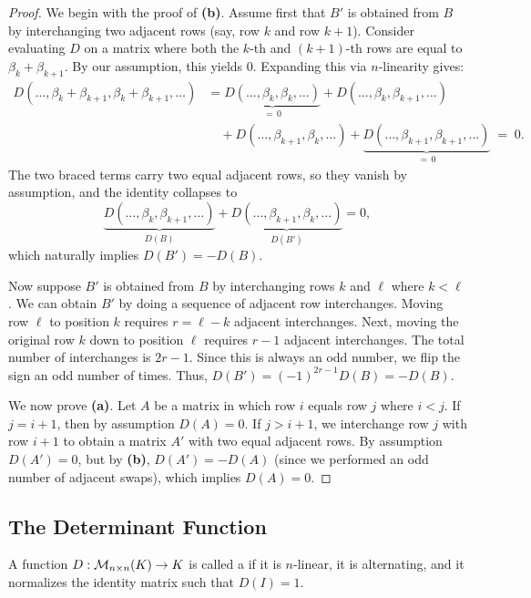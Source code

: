 \begin{proof}
  We begin with the proof of \textbf{(b)}. Assume first that $B'$ is obtained from $B$ by interchanging two adjacent rows (say, row $k$ and row $k+1$).
  Consider evaluating $D$ on a matrix where both the $k$-th and $(k+1)$-th rows are equal to $\beta_k + \beta_{k+1}$. By our assumption, this yields $0$.
  Expanding this via $n$-linearity gives:
  \begin{align*}
    D(\dots, \beta_k + \beta_{k+1}, \beta_k + \beta_{k+1}, \dots)
      &= \underbrace{D(\dots, \beta_k, \beta_k, \dots)}_{=\, 0}
       + D(\dots, \beta_k, \beta_{k+1}, \dots) \\
      &\quad + D(\dots, \beta_{k+1}, \beta_k, \dots)
       + \underbrace{D(\dots, \beta_{k+1}, \beta_{k+1}, \dots)}_{=\, 0} \;=\; 0.
  \end{align*}
  The two braced terms carry two equal adjacent rows, so they vanish by assumption, and the identity collapses to
  \[
  \underbrace{D(\dots, \beta_k, \beta_{k+1}, \dots)}_{D(B)}
  + \underbrace{D(\dots, \beta_{k+1}, \beta_k, \dots)}_{D(B')} = 0,
  \]
  which naturally implies $D(B') = -D(B)$.

  Now suppose $B'$ is obtained from $B$ by interchanging rows $k$ and $\ell$ where $k < \ell$. We can obtain $B'$ by doing a sequence of adjacent row interchanges. Moving row $\ell$ to position $k$ requires $r = \ell-k$ adjacent interchanges. Next, moving the original row $k$ down to position $\ell$ requires $r-1$ adjacent interchanges. The total number of interchanges is $2r - 1$. Since this is always an odd number, we flip the sign an odd number of times. Thus, $D(B') = (-1)^{2r-1} D(B) = -D(B)$.

  We now prove \textbf{(a)}. Let $A$ be a matrix in which row $i$ equals row $j$ where $i < j$. If $j = i+1$, then by assumption $D(A) = 0$. If $j > i+1$, we interchange row $j$ with row $i+1$ to obtain a matrix $A'$ with two equal adjacent rows.
  By assumption $D(A') = 0$, but by \textbf{(b)}, $D(A') = -D(A)$ (since we performed an odd number of adjacent swaps), which implies $D(A) = 0$.
\end{proof}

\subsection{The Determinant Function}

\begin{definition}\label{def:determinant_func}
  A function $D : \mathcal{M}_{n \times n}(K) \to K$ is called a  if it is $n$-linear, it is alternating, and it normalizes the identity matrix such that $D(I) = 1$.
\end{definition}

